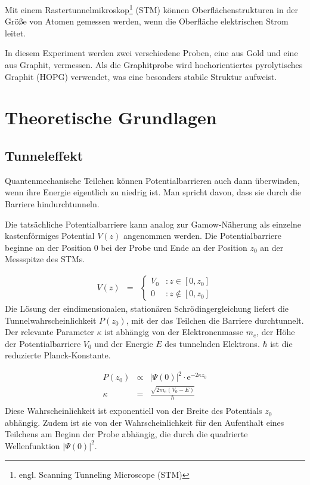 \documentclass[12pt,a4paper]{scrartcl}
\numberwithin{equation}{section} %
\begin{document}
Mit einem Rastertunnelmikroskop\footnote{engl. Scanning Tunneling
  Microscope (STM)} (STM) können Oberflächenstrukturen in der Größe von
Atomen gemessen werden, wenn die Oberfläche elektrischen Strom leitet.

In diesem Experiment werden zwei verschiedene Proben, eine aus Gold und
eine aus Graphit, vermessen. Als die Graphitprobe wird hochorientiertes
pyrolytisches Graphit (HOPG) verwendet, was eine besonders stabile
Struktur aufweist.

\hypertarget{theoretische-grundlagen}{%
\section{Theoretische Grundlagen}\label{theoretische-grundlagen}}

\hypertarget{tunneleffekt}{%
\subsection{Tunneleffekt}\label{tunneleffekt}}

Quantenmechanische Teilchen können Potentialbarrieren auch dann
überwinden, wenn ihre Energie eigentlich zu niedrig ist. Man spricht
davon, dass sie durch die Barriere hindurchtunneln.

Die tatsächliche Potentialbarriere kann analog zur Gamow-Näherung als
einzelne kastenförmiges Potential $V(z)$ angenommen werden. Die
Potentialbarriere beginne an der Position $0$ bei der Probe und Ende
an der Position $z_0$ an der Messspitze des STMs.

\begin{eqnarray}
    V(z) &=&
        \begin{cases}
            V_0 &: z \in [0, z_0] \\
            0 &: z \notin [0, z_0]
        \end{cases}
\end{eqnarray}
Die Lösung der eindimensionalen, stationären Schrödingergleichung
liefert die Tunnelwahrscheinlichkeit $P(z_0)$, mit der das Teilchen
die Barriere durchtunnelt. Der relevante Parameter $\kappa$ ist
abhängig von der Elektronenmasse $m_e$, der Höhe der Potentialbarriere
$V_0$ und der Energie $E$ des tunnelnden Elektrons. $\hbar$ ist
die reduzierte Planck-Konstante.

\begin{eqnarray}
    P(z_0) &\propto& |\Psi(0)|^2 \cdot \mathrm e^{-2\kappa z_0} \\
    \kappa &=& \frac{\sqrt{2m_e(V_0 - E)}}{\hbar} \label{kappa} \\
\end{eqnarray}
Diese Wahrscheinlichkeit ist exponentiell von der Breite des
Potentials $z_0$ abhängig. Zudem ist sie von der Wahrscheinlichkeit
für den Aufenthalt eines Teilchens am Beginn der Probe abhängig, die
durch die quadrierte Wellenfunktion $|\Psi(0)|^2$.
\end{document}
